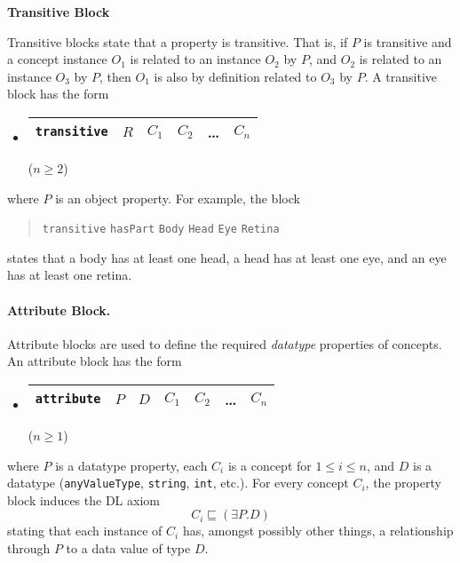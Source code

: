 \documentclass[preprint,number]{elsarticle}
\newcommand{\mypara}[1]{\vspace{12pt}\noindent\textbf{#1}}
\begin{document}
\mypara{Transitive Block} 

\mypara{}Transitive blocks state that a property is transitive. That
is, if $P$ is transitive and a concept instance $O_1$ is related to an
instance $O_2$ by $P$, and $O_2$ is related to an instance $O_3$ by
$P$, then $O_1$ is also by definition related to $O_3$ by $P$. A
transitive block has the form
\begin{itemize}
\item[]
  \begin{tabular}{|l|l|l|l|l|l|}\hline \texttt{transitive} & $R$ & $C_1$
    & $C_2$ & \dots & $C_n$ \\ \hline
  \end{tabular} \hfill ($n \ge 2$)
\end{itemize}
where $P$ is an object property. For example, the block
\begin{quote}\texttt{transitive} \texttt{hasPart} \texttt{Body}
  \texttt{Head} \texttt{Eye} \texttt{Retina}
\end{quote} states that a body has at least one head, a head has at
least one eye, and an eye has at least one retina.




\paragraph{Attribute Block.} Attribute blocks are used to define the
required \emph{datatype} properties of concepts. An attribute block
has the form
\begin{itemize}
\item[]
  \begin{tabular}{|l|l|l|l|l|l|l|}\hline \texttt{attribute} & $P$ & $D$ & $C_1$
    & $C_2$ & \dots & $C_n$ \\ \hline
  \end{tabular} \hfill ($n \ge 1$)
\end{itemize}
where $P$ is a datatype property, each $C_i$ is a concept for $1 \le i
\le n$, and $D$ is a datatype (\texttt{anyValueType}, \texttt{string},
\texttt{int}, etc.). For every concept $C_i$, the property block
induces the DL axiom \[C_i \sqsubseteq (\exists P . D)\] stating that
each instance of $C_i$ has, amongst possibly other things, a
relationship through $P$ to a data value of type $D$.
\end{document}
